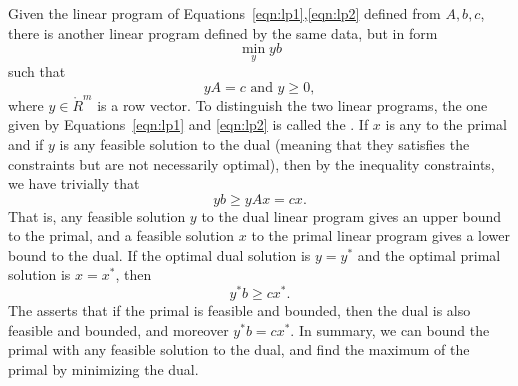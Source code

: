 Given the linear program of Equations~\ref{eqn:lp1},\ref{eqn:lp2}
defined from $A,b,c$, there is another linear program defined by
the same data, but in  form
\begin{equation}
\min_y {y b}
\end{equation}
such that
\begin{equation}
y A = c \text{ and } y \ge 0,
\end{equation}
where $y\in\ring{R}^m$ is a row vector.  To distinguish the two linear
programs, the one given by Equations~\ref{eqn:lp1} and \ref{eqn:lp2}
is called the .  If $x$ is any  to the primal and if $y$ is any feasible solution to the
dual (meaning that they satisfies the constraints but are not
necessarily optimal), then by the inequality constraints, we have
trivially that
$$y b \ge y A x = c x.$$
That is, any feasible solution $y$ to the dual linear program gives an
upper bound to the primal, and a feasible solution $x$ to the primal
linear program gives a lower bound to the dual.  If the optimal dual
solution is $y=y^*$ and the optimal primal solution is $x=x^*$, then
$$y^* b \ge c x^*.$$
The  asserts that if the
primal is feasible and bounded, then the dual is also feasible and
bounded, and moreover $y^* b = c x^*$.  In summary, we can bound the
primal with any feasible solution to the dual, and find the maximum of
the primal by minimizing the dual.

%
%


